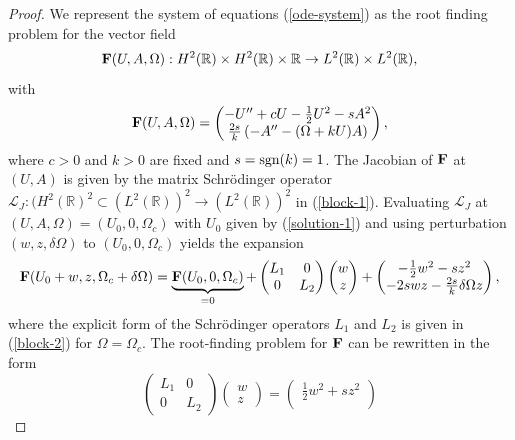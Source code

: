\documentclass[12pt,reqno]{amsart}
\numberwithin{equation}{section}
\begin{document}
\begin{proof}
We represent the system of equations (\ref{ode-system}) as the root finding problem for the vector field
\begin{equation}
    \label{vector-field}
     {\bf F}(U,A,\Omega) : H^2(\mathbb{R}) \times H^2(\mathbb{R}) \times \mathbb{R} \to L^2(\mathbb{R}) \times L^2(\mathbb{R}), 
\end{equation}
with 
\begin{equation*}
    {\bf F}(U,A,\Omega) = \begin{pmatrix} -U'' + c U - \frac{1}{2} U^2 - s A^2 \\  
    \frac{2s}{k} \left( -A'' - (\Omega + kU) A\right) \end{pmatrix}, 
\end{equation*}
where $c > 0$ and $k > 0$ are fixed and $s = {\rm sgn}(k) = 1$. The Jacobian 
of ${\bf F}$ at $(U,A)$ is given by the matrix Schr\"{o}dinger operator $\mathcal{L}_J : (H^2(\mathbb{R})^2 \subset (L^2(\mathbb{R}))^2 \to (L^2(\mathbb{R}))^2$ in (\ref{block-1}). 
Evaluating $\mathcal{L}_J$ at $(U,A,\Omega) = (U_0,0,\Omega_c)$ with $U_0$ given by (\ref{solution-1}) and 
using perturbation $(w,z,\delta \Omega)$ to $(U_0,0,\Omega_c)$ yields 
the expansion
\begin{equation}
    \label{vector-perturbed}
    {\bf F}(U_0+w,z,\Omega_c+\delta \Omega) = \underbrace{{\bf F}(U_0,0,\Omega_c)}_{=0} + 
    \begin{pmatrix} L_1 & 0  \\ 
0 & L_2 
\end{pmatrix} \begin{pmatrix} w \\ z \end{pmatrix} + \begin{pmatrix} - \frac{1}{2} w^2 - s z^2 \\  
    -2 s w z - \frac{2 s}{k} \delta \Omega z \end{pmatrix},
\end{equation}
where the explicit form of the Schr\"{o}dinger operators $L_1$ and $L_2$ is given in (\ref{block-2}) for $\Omega = \Omega_c$.
The root-finding problem for ${\bf F}$ can be rewritten in the form
\begin{equation}
    \label{fixed-point-1}
\begin{pmatrix} L_1 & 0  \\ 
0 & L_2 
\end{pmatrix} \begin{pmatrix} w \\ z \end{pmatrix} = \begin{pmatrix} \frac{1}{2} w^2 + s z^2 \\  

\end{pmatrix}
\end{equation}
\end{proof}
\end{document}
